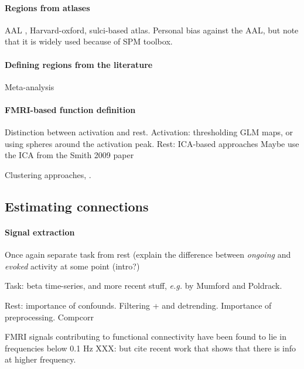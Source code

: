 \documentclass[5p]{elsarticle}
\begin{document}
\paragraph{Regions from atlases}

AAL \cite{tzourio-mazoyer2002a}, Harvard-oxford, sulci-based atlas.
Personal bias against the AAL, but note that it is widely used because of
SPM toolbox.

\paragraph{Defining regions from the literature}
Meta-analysis

\paragraph{FMRI-based function definition}
Distinction between activation and rest.
Activation: thresholding GLM maps, or using spheres around the activation
peak.
Rest: ICA-based approaches \cite{kiviniemi2009} \cite{shirer2012}
\cite{varoquaux2011}
Maybe use the ICA from the Smith 2009 paper

Clustering approaches, \cite{craddock2011}.

\subsection{Estimating connections}


\paragraph{Signal extraction}

Once again separate task from rest (explain the difference between
\emph{ongoing} and \emph{evoked} activity at some point (intro?)

Task: beta time-series, and more recent stuff, \emph{e.g.} by Mumford and
Poldrack.

Rest: importance of confounds. Filtering + and detrending. Importance of
preprocessing.
Compcorr \cite{behzadi2007}
\cite{chai2011}
\cite{satterthwaite2012}

FMRI signals contributing to functional connectivity
have been found to lie in frequencies below 0.1 Hz \cite{cordes2000}
XXX: but cite recent work that shows that there is info at higher
frequency. 
\end{document}

